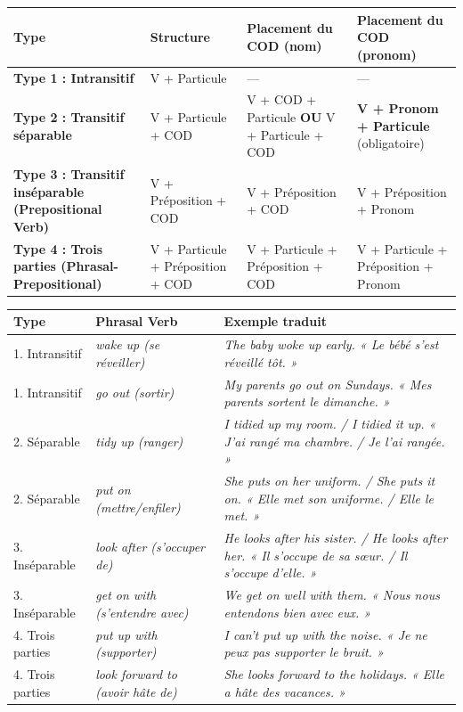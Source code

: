 \documentclass[11pt]{article}
\newcommand{\eng}[1]{\ifmmode\text{\textit{#1}}\else\begingroup\selectlanguage{english}\itshape #1\endgroup\fi}
\begin{document}
\begin{propriete}
\begin{center}
\begin{tabularx}{\linewidth}{|X|X|X|X|}
\hline
\rowcolor{popblueL} \textbf{Type} & \textbf{Structure} & \textbf{Placement du COD (nom)} & \textbf{Placement du COD (pronom)} \\
\hline
\textbf{Type 1 : Intransitif} & V + Particule & --- & --- \\
\hline
\textbf{Type 2 : Transitif séparable} & V + Particule + COD & V + COD + Particule \textbf{OU} V + Particule + COD & \textbf{V + Pronom + Particule} (obligatoire) \\
\hline
\textbf{Type 3 : Transitif inséparable (Prepositional Verb)} & V + Préposition + COD & V + Préposition + COD & V + Préposition + Pronom \\
\hline
\textbf{Type 4 : Trois parties (Phrasal-Prepositional)} & V + Particule + Préposition + COD & V + Particule + Préposition + COD & V + Particule + Préposition + Pronom \\
\hline
\end{tabularx}
\end{center}
\end{propriete}

\begin{exemplebox}
\begin{tabular}{|l|l|l|}
\hline
\textbf{Type} & \textbf{Phrasal Verb} & \textbf{Exemple traduit} \\
\hline
1. Intransitif & \eng{wake up} (se réveiller) & \eng{The baby woke up early.} « Le bébé s'est réveillé tôt. » \\
\hline
1. Intransitif & \eng{go out} (sortir) & \eng{My parents go out on Sundays.} « Mes parents sortent le dimanche. » \\
\hline
2. Séparable & \eng{tidy up} (ranger) & \eng{I tidied up my room.} / \eng{I tidied it up.} « J'ai rangé ma chambre. / Je l'ai rangée. » \\
\hline
2. Séparable & \eng{put on} (mettre/enfiler) & \eng{She puts on her uniform.} / \eng{She puts it on.} « Elle met son uniforme. / Elle le met. » \\
\hline
3. Inséparable & \eng{look after} (s'occuper de) & \eng{He looks after his sister.} / \eng{He looks after her.} « Il s'occupe de sa sœur. / Il s'occupe d'elle. » \\
\hline
3. Inséparable & \eng{get on with} (s'entendre avec) & \eng{We get on well with them.} « Nous nous entendons bien avec eux. » \\
\hline
4. Trois parties & \eng{put up with} (supporter) & \eng{I can't put up with the noise.} « Je ne peux pas supporter le bruit. » \\
\hline
4. Trois parties & \eng{look forward to} (avoir hâte de) & \eng{She looks forward to the holidays.} « Elle a hâte des vacances. » \\
\hline
\end{tabular}
\end{exemplebox}
\end{document}
